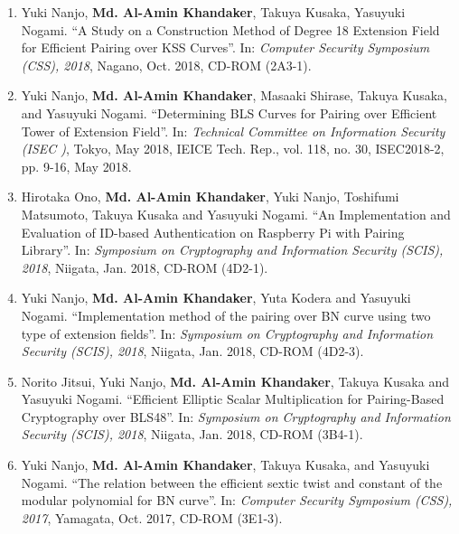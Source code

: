 \begin{enumerate}
	\item Yuki Nanjo,  \textbf{Md. Al-Amin Khandaker}, Takuya Kusaka, Yasuyuki \\Nogami. ``A Study on a Construction Method of Degree 18 Extension Field for Efficient Pairing over KSS Curves''. In: \textit{Computer Security Symposium  (CSS),  2018}, Nagano, Oct. 2018, CD-ROM (2A3-1). 
	\item Yuki Nanjo, \textbf{Md. Al-Amin Khandaker}, Masaaki Shirase, Takuya Kusaka, and Yasuyuki Nogami.
	``Determining BLS Curves for Pairing over Efficient Tower of Extension Field''.
	In: {\it Technical Committee on Information Security (ISEC )}, Tokyo, May 2018,
	IEICE Tech. Rep., vol. 118, no. 30, ISEC2018-2, pp. 9-16, May 2018.
	
	\item  Hirotaka Ono, \textbf{Md. Al-Amin Khandaker}, Yuki Nanjo, Toshifumi Matsumoto, Takuya Kusaka and Yasuyuki Nogami. ``An Implementation and Evaluation of ID-based Authentication on Raspberry Pi with Pairing Library''. In: \textit{Symposium on Cryptography and Information Security (SCIS),  2018}, Niigata, Jan. 2018, CD-ROM (4D2-1).  
	
	\item Yuki Nanjo, \textbf{Md. Al-Amin Khandaker}, Yuta Kodera and Yasuyuki Nogami. ``Implementation method of the pairing over BN curve using two type of extension fields''. In: \textit{Symposium on Cryptography and Information Security (SCIS),  2018}, Niigata, Jan. 2018, CD-ROM (4D2-3).
	
	\item  Norito Jitsui, Yuki Nanjo, \textbf{Md. Al-Amin Khandaker}, Takuya Kusaka and Yasuyuki Nogami. ``Efficient Elliptic Scalar Multiplication for Pairing-Based Cryptography over BLS48''. In:  \textit{Symposium on Cryptography and Information Security (SCIS),  2018}, Niigata, Jan. 2018,  CD-ROM (3B4-1).
	
	\item Yuki Nanjo,  \textbf{Md. Al-Amin Khandaker}, Takuya Kusaka, and  Yasuyuki Nogami. ``The relation between the efficient sextic twist and constant of the modular polynomial for BN curve''. In: \textit{Computer Security Symposium  (CSS),  2017}, Yamagata, Oct. 2017, CD-ROM (3E1-3). 
	
\end{enumerate}
\normalsize




